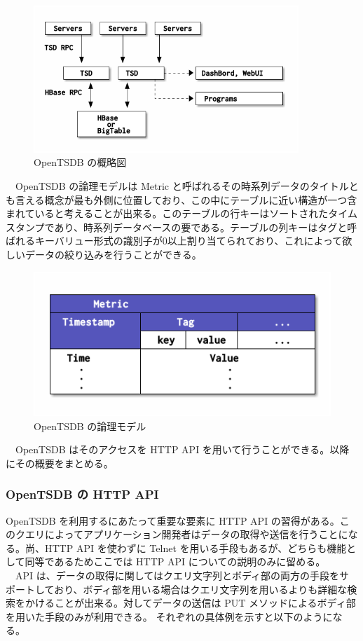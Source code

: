 \documentclass[dvipdfmx]{scrartcl}
\begin{document}
\begin{figure}[htbp]
\centering
\includegraphics[width=10cm]{hoge3.png}
\caption{OpenTSDB の概略図}
\end{figure}

\newpage

　OpenTSDB の論理モデルは Metric と呼ばれるその時系列データのタイトルとも言える概念が最も外側に位置しており、この中にテーブルに近い構造が一つ含まれていると考えることが出来る。このテーブルの行キーはソートされたタイムスタンプであり、時系列データベースの要である。テーブルの列キーはタグと呼ばれるキーバリュー形式の識別子が0以上割り当てられており、これによって欲しいデータの絞り込みを行うことができる。\\

\begin{figure}[htbp]
\centering
\includegraphics[width=12cm]{hoge4.png}
\caption{OpenTSDB の論理モデル}
\end{figure}

　OpenTSDB はそのアクセスを HTTP API を用いて行うことができる。以降にその概要をまとめる。\\

\subsubsection{OpenTSDB の HTTP API}
\label{sec:org4491096}
OpenTSDB を利用するにあたって重要な要素に HTTP API の習得がある。このクエリによってアプリケーション開発者はデータの取得や送信を行うことになる。尚、HTTP API を使わずに Telnet を用いる手段もあるが、どちらも機能として同等であるためここでは HTTP API についての説明のみに留める。\\
　API は、データの取得に関してはクエリ文字列とボディ部の両方の手段をサポートしており、ボディ部を用いる場合はクエリ文字列を用いるよりも詳細な検索をかけることが出来る。対してデータの送信は PUT メソッドによるボディ部を用いた手段のみが利用できる。 それぞれの具体例を示すと以下のようになる。\\
\end{document}
